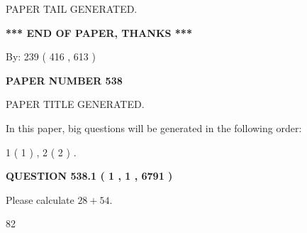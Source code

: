 \documentclass[12pt]{article}
\begin{document}
   
   
\vspace{2.0in} PAPER TAIL GENERATED.
   
   
   
   
\vspace{1.0in} 
{\textbf{\large{ *** END OF PAPER, THANKS *** }}} 
   
   
\hspace{1.0in} By: 
 239 ( 416 ,  613 )
   
   
   
   
\newpage 
\setcounter{page}{ 
   538001 } 
   
   
   
   
 {\textbf{ \Large{ PAPER NUMBER  538  }}}
   
   
\vspace{0.2in}
   
   
   
   
   
   
   
   
 \vspace{0.2in}
 
 
 
 
   
   
 PAPER TITLE GENERATED.
   
   
   
\vspace{0.2in}
   
In this paper, big questions will be generated in the following order: 
   
   
   1 ( 1 )
 ,
   2 ( 2 )
 .
  
\vspace{0.2in}
  
{\textbf{\Large{QUESTION
538.1 
 ( 1 , 1 , 6791 )
}}}
  
  
 
Please calculate $ %
28 +  %
54 $.
 
 
 
\noindent{}
 
 

82
 
 
\noindent{}
 
 

 
 
 
\noindent{}
 
\end{document}
